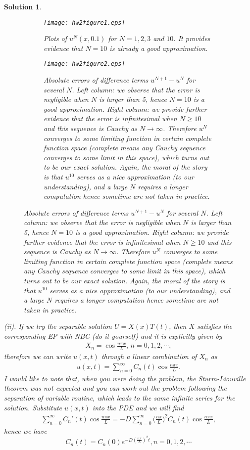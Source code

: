 \documentclass[6pt]{article}
\newtheorem{solution}{Solution}
\numberwithin{equation}{section}
\begin{document}
\begin{enumerate}
\begin{solution}
\begin{figure}
    \centering
    \begin{subfigure}[b]{1\textwidth}
        \texttt{[image: hw2figure1.eps]}
        \caption{Plots of $u^N(x,0.1)$ for $N=1,2,3$ and $10$.  It provides evidence that $N=10$ is already a good approximation.}
    \end{subfigure}
    \begin{subfigure}[b]{1\textwidth}
        \texttt{[image: hw2figure2.eps]}
        \caption{Absolute errors of difference terms $u^{N+1}-u^N$ for several $N$.  Left column: we observe that the error is negligible when $N$ is larger than 5, hence $N=10$ is a good approximation.  Right column: we provide further evidence that the error is infinitesimal when $N\geq10$ and this sequence is Cauchy as $N\rightarrow \infty$.  Therefore $u^N$ converges to some limiting function in certain complete function space (complete means any Cauchy sequence converges to some limit in this space), which turns out to be our exact solution.  Again, the moral of the story is that $u^{10}$ serves as a nice approximation (to our understanding), and a large $N$ requires a longer computation hence sometime are not taken in practice.}
    \end{subfigure}
\label{figure1}
\end{figure}
(ii).  If we try the separable solution $U=X(x)T(t)$, then $X$ satisfies the corresponding EP with NBC (do it yourself) and it is explicitly given by
\begin{align*}
X_n =\cos{\frac{n\pi x}{L}}, \, n=0,1,2,\cdots,
\end{align*}
therefore we can write $u(x,t)$ through a linear combination of $X_n$ as
\begin{align*}
u(x,t)=\sum_{n=0}^{\infty}C_{n}(t)\cos{\frac{n\pi x}{L}}.
\end{align*}
I would like to note that, when you were doing the problem, the Sturm-Liouville theorem was not expected and you can work out the problem following the separation of variable routine, which leads to the same infinite series for the solution.  Substitute $u(x,t)$ into the PDE and we will find
\begin{align*}
\sum_{n=0}^{\infty}C_{n}'(t)\cos{\frac{n\pi x}{L}}=-D\sum_{n=0}^{\infty}\big(\frac{n\pi}{L}\big)^{2}C_{n}(t)\cos{\frac{n\pi x}{L}},
\end{align*}
hence we have
\[C_{n}(t)=C_{n}(0)e^{-D(\frac{n\pi}{L})^{2}t}, n=0,1,2,\cdots\]




\end{solution}
\end{enumerate}
\end{document}

